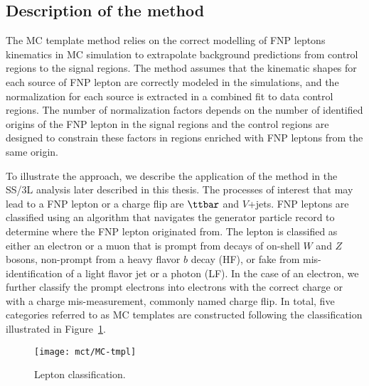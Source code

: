 



\subsection{Description of the method}

The MC template method relies on the correct modelling of FNP leptons kinematics in 
MC simulation to extrapolate background predictions from control regions to the signal regions.
The method assumes that the kinematic shapes for each source of FNP lepton are correctly modeled in the simulations, 
and the normalization for each source is extracted in a combined fit to data control regions.
The number of normalization factors depends on the number of identified origins of the FNP lepton in the signal regions
and the control regions are designed to constrain these factors in regions enriched with FNP leptons from the same origin.

To illustrate the approach, we describe the application of the method in 
the SS/3L analysis later described in this thesis.
The processes of interest that may lead to a FNP lepton or a charge flip are $\ttbar$ and $V$+jets. 
FNP leptons are classified using an algorithm that navigates the generator particle record to determine where the FNP lepton 
originated from. 
The lepton is classified as either an electron or a muon that is prompt from decays of on-shell $W$ and $Z$ bosons, 
non-prompt from a heavy flavor $b$ decay (HF), or fake from mis-identification of a light flavor jet or a photon (LF). 
In the case of an electron, we further classify the prompt electrons into electrons with the correct charge or with a 
charge mis-measurement, commonly named charge flip.
In total, five categories referred to as MC templates are constructed 
following the classification illustrated 
in Figure~\ref{Figurefakes_classification}.

\begin{figure}[t!]
\centering
\texttt{[image: mct/MC-tmpl]}
\caption
{Lepton classification.
}
\label{Figurefakes_classification}
\end{figure}

